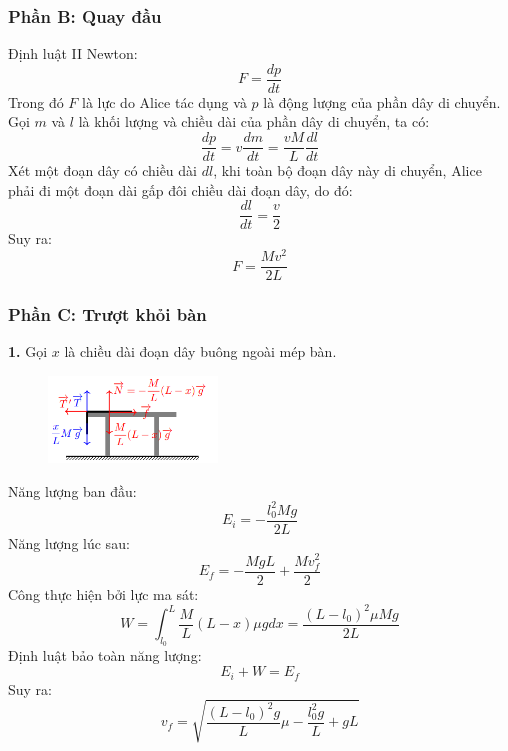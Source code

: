 \subsubsection*{Phần B: Quay đầu}
\noindent Định luật II Newton:
\begin{equation*}
  F = \frac{dp}{dt}
\end{equation*}
Trong đó $F$ là lực do Alice tác dụng và $p$ là động lượng của phần dây di chuyển. Gọi $m$ và $l$ là khối lượng và chiều dài của phần dây di chuyển, ta có:
\begin{equation*}
  \frac{dp}{dt} = v \frac{dm}{dt} = \frac{vM}{L} \frac{dl}{dt}
\end{equation*}
Xét một đoạn dây có chiều dài $dl$, khi toàn bộ đoạn dây này di chuyển, Alice phải đi một đoạn dài gấp đôi chiều dài đoạn dây, do đó:
\begin{equation*}
  \frac{dl}{dt} = \frac{v}{2}
\end{equation*}
Suy ra:
\begin{equation*}
  F = \frac{Mv^2}{2L}
\end{equation*}

\subsubsection*{Phần C: Trượt khỏi bàn}
\noindent\textbf{1.} Gọi $x$ là chiều dài đoạn dây buông ngoài mép bàn.
\begin{figure}[H]
  \centering
  \includegraphics[width=0.4\textwidth]{Figures/Solutions/Fig 3.3.png}
\end{figure}
\vspace{-0.5cm}

\noindent Năng lượng ban đầu:
\begin{equation*}
  E_i = -\frac{l_0^2Mg}{2L}
\end{equation*}
Năng lượng lúc sau:
\begin{equation*}
  E_f = -\frac{MgL}{2} + \frac{Mv_f^2}{2}
\end{equation*}
Công thực hiện bởi lực ma sát:
\begin{equation*}
  W = \int_{l_0}^{L} \frac{M}{L}(L - x)\mu g dx = \frac{(L - l_0)^2 \mu Mg}{2L}
\end{equation*}
Định luật bảo toàn năng lượng:
\begin{equation*}
  E_i + W = E_f
\end{equation*}
Suy ra:
\begin{equation*}
  v_f=\sqrt{\frac{(L-l_0)^2 g}{L}\mu-\frac{l_0^2 g}{L}+gL}
\end{equation*}

